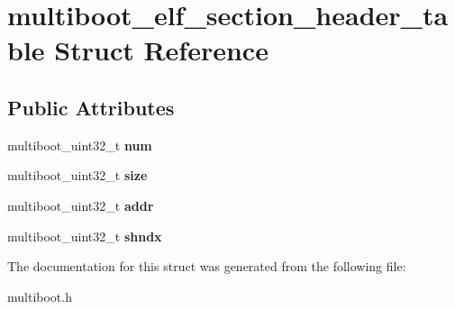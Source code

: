 \hypertarget{structmultiboot__elf__section__header__table}{}\section{multiboot\+\_\+elf\+\_\+section\+\_\+header\+\_\+table Struct Reference}
\label{structmultiboot__elf__section__header__table}
\subsection*{Public Attributes}
\begin{DoxyCompactItemize}
\item 
\mbox{\label{structmultiboot__elf__section__header__table_ac7a3ee82a45af6c3c10413de7620eec2}} 
multiboot\+\_\+uint32\+\_\+t {\bfseries num}
\item 
\mbox{\label{structmultiboot__elf__section__header__table_a87bed62f532b2e2e73ab41df40069e2a}} 
multiboot\+\_\+uint32\+\_\+t {\bfseries size}
\item 
\mbox{\label{structmultiboot__elf__section__header__table_ad0c7bb0937470de83f3319015416614a}} 
multiboot\+\_\+uint32\+\_\+t {\bfseries addr}
\item 
\mbox{\label{structmultiboot__elf__section__header__table_adfc74c974ba232064320ba57a02d0fb3}} 
multiboot\+\_\+uint32\+\_\+t {\bfseries shndx}
\end{DoxyCompactItemize}


The documentation for this struct was generated from the following file\+:\begin{DoxyCompactItemize}
\item 
multiboot.\+h\end{DoxyCompactItemize}
